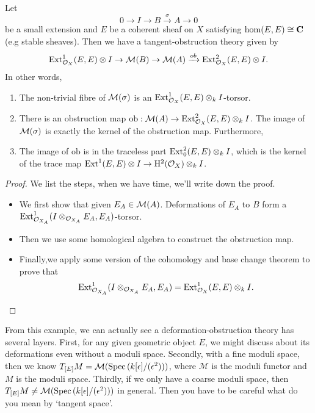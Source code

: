 \documentclass[../main.tex]{subfiles}
\begin{document}
\begin{theorem}
Let $$0\rightarrow I\rightarrow B\xrightarrow{\sigma}A\rightarrow 0$$
be a small extension and $E$ be a coherent sheaf on $X$ satisfying $\hom(E,E)\cong \mathbf{C}$(e.g stable sheaves). Then we have a tangent-obstruction theory given by 
$$\mathrm{Ext}^{1}_{\mathcal{O}_{X}}(E, E)\otimes I\rightarrow \mathcal{M}(B)\rightarrow \mathcal{M}(A)\xrightarrow{ob} \mathrm{Ext}^{2}_{\mathcal{O}_{X}}(E, E)\otimes I .$$
In other words, 
 \begin{enumerate}
   \item The non-trivial fibre of $\mathcal{M}(\sigma)$ is an $\mathrm{Ext}^{1}_{\mathcal{O}_{X}}(E, E)\otimes_{k}I$-torsor.
   \item There is an obstruction map $\mathrm{ob}:\mathcal{M}(A)\rightarrow \mathrm{Ext}^{2}_{\mathcal{O}_{X}}(E, E)\otimes_{k}I$. The image of $\mathcal{M}(\sigma)$ is exactly the kernel of the obstruction map. Furthermore,
   \item The image of $\mathrm{ob}$ is in the traceless part $\mathrm{Ext}^{2}_{0}(E, E)\otimes_{k}I$, which is the kernel of the trace map $\mathrm{Ext}^{1}(E, E)\otimes I\rightarrow \mathrm{H}^{2}(\mathcal{O}_{X})\otimes_{k} I$.  
 \end{enumerate}
\end{theorem}
\begin{proof}
We list the steps, when we have time, we'll write down the proof.
\begin{itemize}
    \item We first show that given $E_{A}\in \mathcal{M}(A)$. Deformations of $E_{A}$ to $B$ form a $\mathrm{Ext}^{1}_{\mathcal{O}_{X_{A}}}(I\otimes_{\mathcal{O}_{X_{A}}}E_{A}, E_{A})$-torsor.
    \item Then we use some homological algebra to construct the obstruction map. 
    \item Finally,we apply some version of the cohomology and base change theorem to prove that $$\mathrm{Ext}^{1}_{\mathcal{O}_{X_{A}}}(I\otimes_{\mathcal{O}_{X_{A}}}E_{A}, E_{A})=\mathrm{Ext}^{1}_{\mathcal{O}_{X}}(E,E)\otimes_{k}I.$$
\end{itemize}
 
\end{proof}

\begin{remark}
From this example, we can actually see a deformation-obstruction theory has several layers. First, for any given geometric object $E$, we might discuss about its deformations even without a moduli space.  Secondly, with a fine moduli space, then we know $T_{[E]}M= \mathcal{M}(\operatorname{Spec\,}(k[\epsilon]/(\epsilon^{2})))$, where $\mathcal{M}$ is the moduli functor and $M$ is the moduli space. Thirdly, if we only have a coarse moduli space, then $T_{[E]}M\neq \mathcal{M}(\operatorname{Spec\,}(k[\epsilon]/(\epsilon^{2})))$ in general. Then you have to be careful what do you mean by `tangent space'.
\end{remark}
\end{document}
